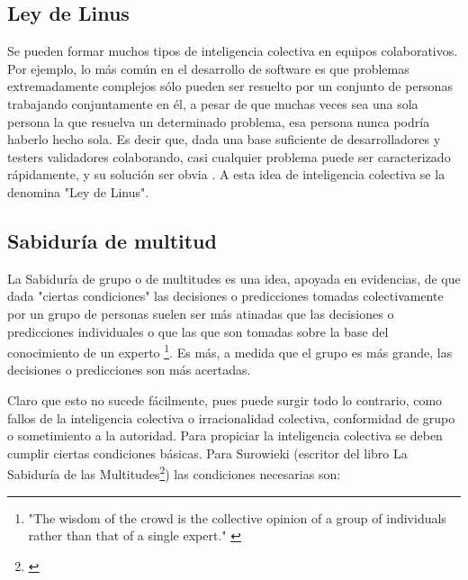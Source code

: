 \subsection{Ley de Linus}

Se pueden formar muchos tipos de inteligencia colectiva en equipos colaborativos. Por ejemplo, lo más común en el desarrollo de software es que problemas extremadamente complejos sólo pueden ser resuelto por un conjunto de personas trabajando conjuntamente en él, a pesar de que muchas veces sea una sola persona la que resuelva un determinado problema, esa persona nunca podría haberlo hecho sola. Es decir que, dada una base suficiente de desarrolladores y testers validadores colaborando, casi cualquier problema puede ser caracterizado rápidamente, y su solución ser obvia \cite{Eric-Raymond-1997}. A esta idea de inteligencia colectiva se la denomina "Ley de Linus".

\subsection{Sabiduría de multitud}

La Sabiduría de grupo o de multitudes es una idea, apoyada en evidencias, de que dada "ciertas condiciones" las decisiones o predicciones tomadas colectivamente por un grupo de personas suelen ser más atinadas que las decisiones o predicciones individuales o que las que son tomadas sobre la base del conocimiento de un experto \cite{James-Surowiecki-2005}\footnote{"The wisdom of the crowd is the collective opinion of a group of individuals rather than that of a single expert." \cite{MIT-Press-2009}}. Es más, a medida que el grupo es más grande, las decisiones o predicciones son más acertadas.

Claro que esto no sucede fácilmente, pues puede surgir todo lo contrario, como fallos de la inteligencia colectiva o irracionalidad colectiva, conformidad de grupo o sometimiento a la autoridad. Para propiciar la inteligencia colectiva se deben cumplir ciertas condiciones básicas. Para Surowieki (escritor del libro La Sabiduría de las Multitudes\footnote{\cite{James-Surowiecki-2005}}) las condiciones necesarias son:

